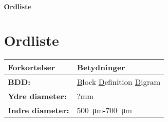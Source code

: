 \textbf{Ordliste}
\section*{Ordliste}
\begin{center}
		\begin{longtable}{ | m{6.5cm} | m{6.5cm}| } 
			\hline
			\textbf{Forkortelser} &\textbf{Betydninger} \\ 
			\hline
			\textbf{BDD:} &  \underline{B}lock \underline{D}efinition \underline{D}igram \\ 
			\hline
			\textbf{Ydre diameter:} & ?mm  \\ 
			\hline
			\textbf{Indre diameter:} & \SI{500}{\micro\metre}-\SI{700}{\micro\metre}  \\ 
			\hline			
		\end{longtable}
\end{center}